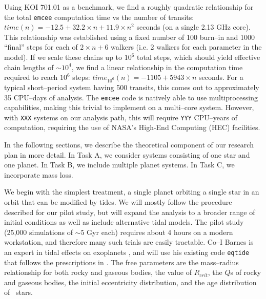 Using KOI 701.01 as a benchmark, we find a roughly quadratic
relationship for the total {\tt emcee} computation time vs the number
of transits: $time(n) = -12.5 + 32.2 \times n + 11.9 \times n^2$
seconds (on a single 2.13 GHz core).  This relationship was
established using a fixed number of 100 burn--in and 1000 ``final''
steps for each of $2 \times n + 6$ walkers (i.e. 2 walkers for each
parameter in the model).  If we scale these chains up to $10^6$ total
steps, which should yield effective chain lengths of $\sim 10^4$, we
find a linear relationship in the computation time required to reach
$10^6$ steps: $time_{10^6}(n) = -1105 + 5943 \times n$ seconds.  For a
typical short--period system having 500 transits, this comes out to
approximately 35 CPU--days of analysis.  The {\tt emcee} code is
natively able to use multiprocessing capabilities, making this trivial
to implement on a multi--core system.  However, with {\tt XXX} systems
on our analysis path, this will require {\tt YYY} CPU--years of
computation, requiring the use of NASA's High-End Computing (HEC)
facilities.  


In the following sections, we describe the theoretical component of
our research plan in more detail.  In Task A, we consider systems
consisting of one star and one planet.  In Task B, we include multiple
planet systems. In Task C, we incorporate mass loss.

\medskip
{\centerline{}}
\smallskip

We begin with the simplest treatment, a single planet orbiting a
single star in an orbit that can be modified by tides.  We will mostly
follow the procedure described for our pilot study, but will expand
the analysis to a broader range of initial conditions as well as
include alternative tidal models.  The pilot study (25,000 simulations
of $\sim 5$ Gyr each) requires about 4 hours on a modern workstation,
and therefore many such trials are easily tractable.  Co--I Barnes is
an expert in tidal effects on exoplanets
\cite{Barnes08,Jackson08a,Barnes09,Barnes12}, and will use his
existing code \texttt{eqtide} that follows the prescriptions in
\cite{Barnes12}.  The free parameters are the mass--radius
relationship for both rocky and gaseous bodies, the value of
$R_{crit}$, the $Q$s of rocky and gaseous bodies, the initial
eccentricity distribution, and the age distribution of \kepler~stars.

